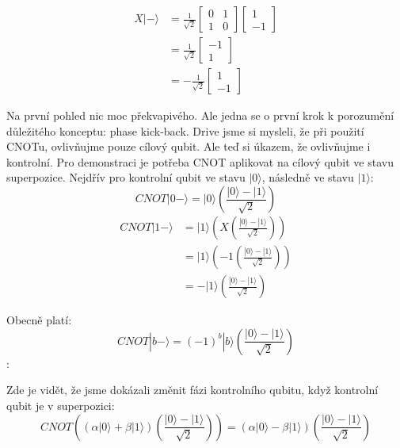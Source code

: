 \documentclass[11pt]{article}
\begin{document}
\begin{equation*}
    \begin{split}
        X|-\rangle & = \frac{1}{\sqrt{2}}\begin{bmatrix}
            0 & 1 \\
            1 & 0
        \end{bmatrix} \begin{bmatrix}
            1 \\
            -1
        \end{bmatrix} \\
        & = \frac{1}{\sqrt{2}} \begin{bmatrix}
            -1 \\
            1
        \end{bmatrix}\\
        & =  -\frac{1}{\sqrt{2}} \begin{bmatrix}
            1 \\
            -1
        \end{bmatrix}
    \end{split}
\end{equation*}
\par Na první pohled nic moc překvapivého.
Ale jedna se o první krok k porozumění důležitého konceptu: phase kick-back.
Drive jsme si mysleli, že při použití CNOTu, ovlivňujme pouze cílový qubit.
Ale teď si úkazem, že ovlivňujme i kontrolní.
Pro demonstraci je potřeba CNOT aplikovat na cílový qubit ve stavu superpozice.
Nejdřív pro kontrolní qubit ve stavu $|0\rangle$, následně ve stavu $|1\rangle$:
$$CNOT |0-\rangle = |0\rangle \left(\frac{|0\rangle - |1\rangle}{\sqrt{2}}\right)$$
\begin{equation*}
    \begin{split}
        CNOT |1-\rangle & = |1\rangle \left(X \left(\frac{|0\rangle - |1\rangle}{\sqrt{2}}\right)\right) \\
        & = |1\rangle \left(-1\left(\frac{|0\rangle - |1\rangle}{\sqrt{2}}\right)\right) \\
        & = -|1\rangle \left(\frac{|0\rangle - |1\rangle}{\sqrt{2}}\right)
    \end{split}
\end{equation*}
\par Obecně platí:
$$CNOT |b-\rangle = (-1)^b|b\rangle\left(\frac{|0\rangle - |1\rangle}{\sqrt{2}}\right)$$:
\par Zde je vidět, že jsme dokázali změnit fázi kontrolního qubitu, když kontrolní qubit je v superpozici:
$$CNOT\left((\alpha|0\rangle + \beta|1\rangle)\left(\frac{|0\rangle - |1\rangle}{\sqrt{2}}\right)\right) = (\alpha|0\rangle - \beta|1\rangle)\left(\frac{|0\rangle - |1\rangle}{\sqrt{2}}\right)$$
\end{document}
